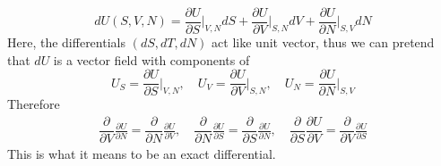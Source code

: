 \documentclass[../main.tex]{subfiles}
\begin{document}
\begin{equation*}
    dU(S,V,N)=\frac{\partial U}{\partial S}\bigg|_{V,N} dS + \frac{ \partial U}{\partial V}\bigg|_{S,N} dV+ \frac{\partial U}{\partial N}\bigg|_{S,V}dN
\end{equation*}
Here, the differentials $(dS,dT,dN)$ act like unit vector, thus we can pretend that $dU$ is a vector field with components of
\begin{equation*}
    U_S=\frac{\partial U}{\partial S}\bigg|_{V,N}, \quad
    U_V=\frac{ \partial U}{\partial V}\bigg|_{S,N},\quad
    U_N=\frac{\partial U}{\partial N}\bigg|_{S,V}
\end{equation*}
Therefore
\begin{align*}
    \dfrac{\partial }{\partial V} \frac{\partial U}{\partial N}  = \dfrac{\partial }{\partial N}\frac{ \partial U}{\partial V},\quad
    \dfrac{\partial }{\partial N}\frac{\partial U}{\partial S}=\dfrac{\partial }{\partial S}\frac{\partial U}{\partial N},\quad
    \dfrac{\partial }{\partial S}\dfrac{ \partial U}{\partial V}=\dfrac{\partial }{\partial V}\frac{\partial U}{\partial S}
\end{align*}
This is what it means to be an exact differential.
\end{document}
